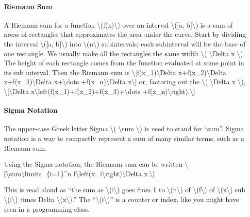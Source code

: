 \hypertarget{riemann-sum}{%
\paragraph{Riemann Sum}\label{riemann-sum}}

A Riemann sum for a function \textbackslash{}(f(x)\textbackslash{}) over
an interval \textbackslash{}({[}a, b{]}\textbackslash{}) is a sum of
areas of rectangles that approximates the area under the curve. Start by
dividing the interval \textbackslash{}({[}a, b{]}\textbackslash{}) into
\textbackslash{}(n\textbackslash{}) subintervals; each subinterval will
be the base of one rectangle. We usually make all the rectangles the
same width \textbackslash{}( \textbackslash{}Delta x \textbackslash{}).
The height of each rectangle comes from the function evaluated at some
point in its sub interval. Then the Riemann sum is
\textbackslash{}{[}f(x\_1)\textbackslash{}Delta
x+f(x\_2)\textbackslash{}Delta x+f(x\_3)\textbackslash{}Delta
x+\textbackslash{}dots +f(x\_n)\textbackslash{}Delta
x\textbackslash{}{]} or, factoring out the \textbackslash{}(
\textbackslash{}Delta x \textbackslash{}),
\textbackslash{}{[}\textbackslash{}Delta
x\textbackslash{}left(f(x\_1)+f(x\_2)+f(x\_3)+\textbackslash{}dots
+f(x\_n)\textbackslash{}right).\textbackslash{}{]}

\hypertarget{sigma-notation}{%
\paragraph{Sigma Notation}\label{sigma-notation}}

The upper-case Greek letter Sigma \textbackslash{}( \textbackslash{}sum
\textbackslash{}) is used to stand for ``sum''. Sigma notation is a way
to compactly represent a sum of many similar terms, such as a Riemann
sum.

Using the Sigma notation, the Riemann sum can be written
\textbackslash{}{[}\textbackslash{}sum\textbackslash{}limits\_\{i=1\}\^{}n
f\textbackslash{}left(x\_i\textbackslash{}right)\textbackslash{}Delta
x.\textbackslash{}{]}

This is read aloud as ``the sum as \textbackslash{}(i\textbackslash{})
goes from 1 to \textbackslash{}(n\textbackslash{}) of
\textbackslash{}(f\textbackslash{}) of
\textbackslash{}(x\textbackslash{}) sub
\textbackslash{}(i\textbackslash{}) times Delta
\textbackslash{}(x\textbackslash{}).'' The
``\textbackslash{}(i\textbackslash{})'' is a counter or index, like you
might have seen in a programming class.

